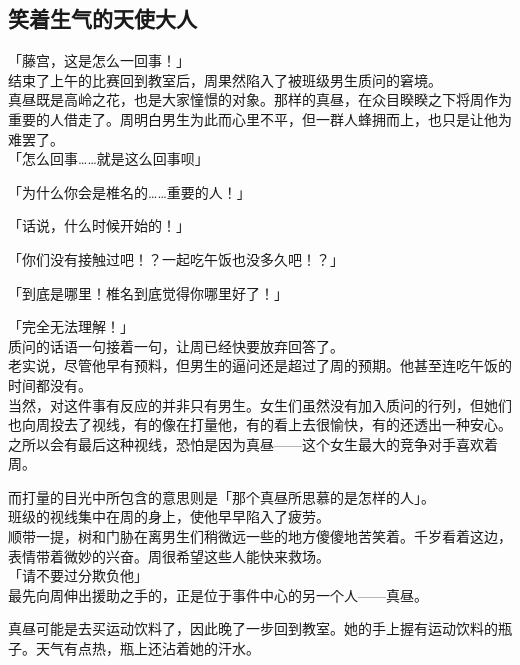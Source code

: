 \subsection{笑着生气的天使大人}

「藤宫，这是怎么一回事！」\\

结束了上午的比赛回到教室后，周果然陷入了被班级男生质问的窘境。\\

真昼既是高岭之花，也是大家憧憬的对象。那样的真昼，在众目睽睽之下将周作为重要的人借走了。周明白男生为此而心里不平，但一群人蜂拥而上，也只是让他为难罢了。\\

「怎么回事……就是这么回事呗」

「为什么你会是椎名的……重要的人！」

「话说，什么时候开始的！」

「你们没有接触过吧！？一起吃午饭也没多久吧！？」

「到底是哪里！椎名到底觉得你哪里好了！」

「完全无法理解！」\\

质问的话语一句接着一句，让周已经快要放弃回答了。\\

老实说，尽管他早有预料，但男生的逼问还是超过了周的预期。他甚至连吃午饭的时间都没有。\\

当然，对这件事有反应的并非只有男生。女生们虽然没有加入质问的行列，但她们也向周投去了视线，有的像在打量他，有的看上去很愉快，有的还透出一种安心。\\

之所以会有最后这种视线，恐怕是因为真昼——这个女生最大的竞争对手喜欢着周。

而打量的目光中所包含的意思则是「那个真昼所思慕的是怎样的人」。\\

班级的视线集中在周的身上，使他早早陷入了疲劳。\\

顺带一提，树和门胁在离男生们稍微远一些的地方傻傻地苦笑着。千岁看着这边，表情带着微妙的兴奋。周很希望这些人能快来救场。\\

「请不要过分欺负他」\\

最先向周伸出援助之手的，正是位于事件中心的另一个人——真昼。

真昼可能是去买运动饮料了，因此晚了一步回到教室。她的手上握有运动饮料的瓶子。天气有点热，瓶上还沾着她的汗水。\\

